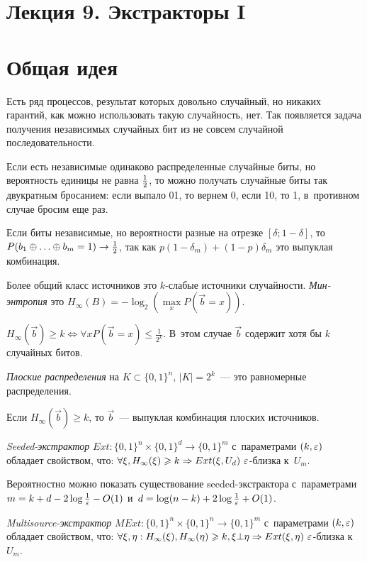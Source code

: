 \documentclass{article}
\begin{document}
\section*{Лекция 9. Экстракторы I}
\resetcntrs

\section{Общая идея}

Есть ряд процессов, результат которых довольно случайный, но никаких
гарантий, как можно использовать такую случайность, нет. Так появляется задача
получения независимых случайных бит из не совсем случайной последовательности.

\begin{example}
	Если есть независимые одинаково распределенные случайные биты, но вероятность
	единицы не равна $1\over2$, то можно получать случайные биты так двукратным
	бросанием: если выпало 01, то вернем 0, если 10, то 1, в~противном случае
	бросим еще раз.

	Если биты независимые, но вероятности разные на отрезке $[\delta; 1 -
	\delta]$, то $P(b_1 \oplus \ldots \oplus b_m = 1) \rightarrow {1\over2}$, так
	как $p(1 - \delta_m) + (1 - p)\delta_m$ это выпуклая комбинация.
\end{example}

Более общий класс источников это $k$-слабые источники случайности.
\emph{Мин-энтропия} это $H_\infty(B) = -\log_2\left( \max\limits_x P(\vec b = x)
\right)$.

$H_\infty(\vec b) \ge k \Leftrightarrow \forall x P(\vec b = x) \le
\frac{1}{2^k}$. В~этом случае $\vec b$ содержит хотя бы $k$ случайных битов.

\emph{Плоские распределения} на $K \subset \{0, 1\}^n$, $|K| = 2^k$~--- это
равномерные распределения.

\begin{theorem}
	Если $H_\infty(\vec b) \ge k$, то $\vec b$~--- выпуклая комбинация плоских
	источников.
\end{theorem}

\begin{definition}
	\emph{Seeded-экстрактор} $Ext: \{0, 1\}^n \times \{0, 1\}^d \rightarrow
	\{0, 1\}^m$ с~параметрами $(k, \varepsilon)$ обладает свойством, что:
	$\forall\xi, H_\infty(\xi)
	\geqslant k \Rightarrow Ext(\xi, U_d)\ \varepsilon$-близка к~$U_m$.
\end{definition}

Вероятностно можно показать существование seeded-экстрактора с~параметрами
$m = k + d - 2\log \frac{1}{\varepsilon} - O(1)$ и~$d = \log(n - k) +
2\log\frac{1}{\varepsilon} + O(1)$.

\begin{definition}
	\emph{Multisource-экстрактор} $MExt: \{0, 1\}^n \times \{0, 1\}^n \rightarrow
	\{0, 1\}^m$ с~параметрами $(k, \varepsilon)$ обладает свойством, что:
	$\forall\xi, \eta: H_\infty(\xi), H_\infty(\eta) \geqslant k, \xi \bot \eta
	\Rightarrow Ext(\xi, \eta)\ \varepsilon$-близка к~$U_m$.
\end{definition}
\end{document}
